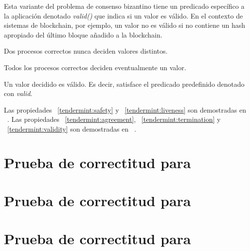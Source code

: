 Esta variante del problema de consenso bizantino tiene un predicado específico a la aplicación
denotado \textit{valid()} que indica si un valor es válido. En el contexto de sistemas de blockchain, por ejemplo,
un valor no es válido si no contiene un hash apropiado del último bloque añadido a la blockchain.

\begin{property}[Agreement]\label{tendermint:agreement}
  Dos procesos correctos nunca deciden valores distintos.
\end{property}

\begin{property}[Termination]\label{tendermint:termination}
    Todos los procesos correctos deciden eventualmente un valor.
\end{property}

\begin{property}[Validity]\label{tendermint:validity}
    Un valor decidido es válido. Es decir, satisface el predicado predefinido
    denotado con \textit{valid}.
\end{property}
%

Las propiedades ~\ref{tendermint:safety} y ~\ref{tendermint:liveness} son demostradas en ~\cite{Kwon2014TendermintC}.
Las propiedades ~\ref{tendermint:agreement}, ~\ref{tendermint:termination} y ~\ref{tendermint:validity}
son demostradas en ~\cite{Buchman.2018.Tendermint}.

\section{Prueba de correctitud para \vanilla}\label{sec:proof-vanilla}
\section{Prueba de correctitud para \compresschain}\label{sec:proof-compresschain}
\section{Prueba de correctitud para \hashchain}\label{sec:proof-hashchain}


